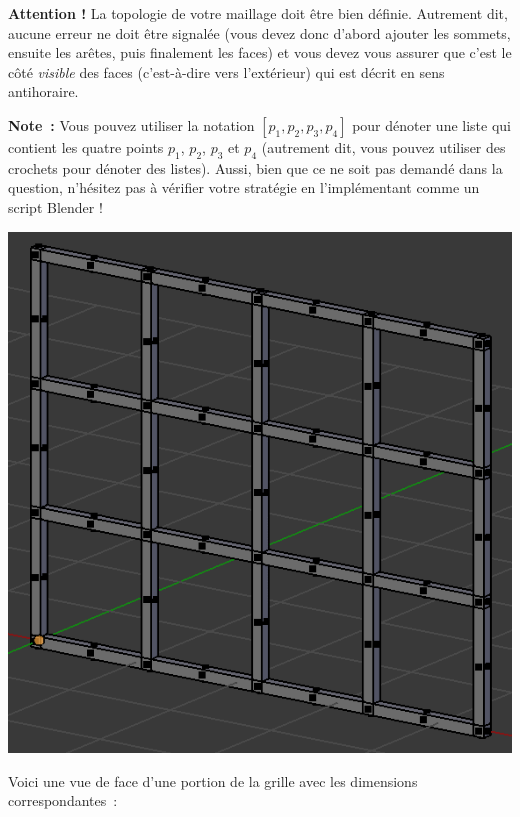\documentclass[12pt,addpoints]{exam}
\begin{document}
\begin{questions}
\textbf{Attention !} La topologie de votre maillage doit être bien définie. Autrement dit, aucune erreur ne doit être signalée (vous devez donc d'abord ajouter les sommets, ensuite les arêtes, puis finalement les faces) et vous devez vous assurer que c'est le côté \emph{visible} des faces (c'est-à-dire vers l'extérieur) qui est décrit en sens antihoraire.

\textbf{Note~:} Vous pouvez utiliser la notation $[p_1,p_2,p_3,p_4]$ pour dénoter une liste qui contient les quatre points $p_1$, $p_2$, $p_3$ et $p_4$ (autrement dit, vous pouvez utiliser des crochets pour dénoter des listes). Aussi, bien que ce ne soit pas demandé dans la question, n'hésitez pas à vérifier votre stratégie en l'implémentant comme un script Blender !

\begin{center} \includegraphics[width=.45\linewidth]{images/grille-3d.png} \end{center}

Voici une vue de face d'une portion de la grille avec les dimensions correspondantes~:


\end{questions}
\end{document}
